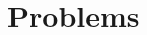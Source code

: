 \newpage
\section*{Problems}

\begin{multicols}{2}
  \begin{enumerate}[itemsep=4pt,leftmargin=12pt]
%
%  
%

\end{enumerate}
\end{multicols}
